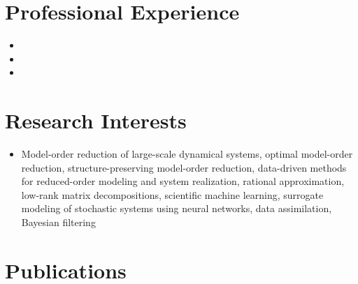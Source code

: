 \documentclass[10pt,a4paper,sans]{moderncv}        %
\begin{document}
\section{Professional Experience}
\vspace{5pt}
\begin{itemize}  
    \item{}
    \vspace{3pt}
    \item{}
    \vspace{3pt}
    \item{}
    \vspace{3pt}
\end{itemize}

\section{Research Interests}
\vspace{5pt}
\begin{itemize}
    \item Model-order reduction of large-scale dynamical systems, optimal model-order reduction, structure-preserving model-order reduction, data-driven methods for reduced-order modeling and system realization, rational approximation, low-rank matrix decompositions, scientific machine learning, surrogate modeling of stochastic systems using neural networks, data assimilation, Bayesian filtering
\end{itemize}

\section{Publications}
\vspace{5pt}
\end{document}
